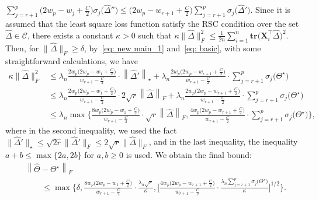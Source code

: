 \documentclass[12pt]{article}
\begin{document}
$\sum_{j=r+1}^{p}\big(2w_{p}-w_{j}+\frac{C}{2}\big)\sigma_{j}\big(\widehat{\Delta}''\big)\leq \big(2w_{p}-w_{r+1}+\frac{C}{2}\big) \sum_{j=r+1}^{p}\sigma_{j}\big(\widehat{\Delta}'\big)$.
\noindent 
Since it is assumed that the least square loss function satisfy the RSC condition over the set $\widehat{\Delta}\in\mathcal{C}$, there exists a constant $\kappa>0$ such that $\kappa \|\widehat{\Delta}\|_{F}^{2}\leq \frac{1}{2n}\sum^{n}_{i=1} \textbf{tr}(\mathbf{X}_{i}^{\top}\widehat{\Delta}\big)^{2}$. 
Then, for $\|\widehat{\Delta}\|_{F}\geq \delta$, by~\eqref{eq: new main_1} and~\eqref{eq: basic}, with some straightforward calculations, we have
\begin{align} 
    \kappa \|\widehat{\Delta}\|_{F}^{2}
    &\leq 
    \lambda_{n}\frac{2w_{p}\big(2w_{p}-w_{1}+\frac{C}{2}\big)}{w_{r+1}-\frac{C}{2}}
    \cdot \left\| \widehat{\Delta}' \right\|_{\star}
    + \lambda_{n}\frac{2w_{p}\big(2w_{p}-w_{r+1}+\frac{C}{2}\big)}{w_{r+1}-\frac{C}{2}} \cdot \sum_{j=r+1}^{p}\sigma_{j}\big(\Theta^{\star}\big) \nonumber \\
    &\leq 
    \lambda_{n}\frac{2w_{p}\big(2w_{p}-w_{1}+\frac{C}{2}\big)}{w_{r+1}-\frac{C}{2}}
    \cdot 2\sqrt{r} \left\| \widehat{\Delta} \right\|_{F}
    + \lambda_{n}\frac{2w_{p}\big(2w_{p}-w_{r+1}+\frac{C}{2}\big)}{w_{r+1}-\frac{C}{2}} \cdot \sum_{j=r+1}^{p}\sigma_{j}\big(\Theta^{\star}\big) \nonumber \\
    &\leq 
    \lambda_{n} 
    \max\bigg\{ \frac{8w_{p}\big(2w_{p}-w_{1}+\frac{C}{2}\big)}{w_{r+1}-\frac{C}{2}}
    \cdot \sqrt{r} \left\| \widehat{\Delta} \right\|_{F},
    \frac{4w_{p}\big(2w_{p}-w_{r+1}+\frac{C}{2}\big)}{w_{r+1}-\frac{C}{2}} \cdot \sum_{j=r+1}^{p}\sigma_{j}\big(\Theta^{\star}\big) 
    \bigg\} \nonumber,
\end{align}
where in the second inequality, we used the fact 
$\|\widehat{\Delta}'\|_{\star}\leq\sqrt{2r}\|\widehat{\Delta}'\|_{F}
\leq 2\sqrt{r}\|\widehat{\Delta}\|_{F}$, and in the last inequality, 
the inequality $a+b\leq \max\{2a, 2b\}$ for $a,b\geq 0$ is used.
We obtain the final bound:
\begin{align*}
    &\left\| \widehat{\Theta} - \Theta^{\star} \right\|_{F} \\
    &\qquad \leq \max\bigg\{ \delta, \frac{8w_{p}\big(2w_{p}-w_{1}+\frac{C}{2}\big)}{w_{r+1}-\frac{C}{2}}
    \cdot \frac{\lambda_{n}\sqrt{r}}{\kappa}, 
    \bigg[  \frac{4w_{p}\big(2w_{p}-w_{r+1}+\frac{C}{2}\big)}{w_{r+1}-\frac{C}{2}} \cdot \frac{\lambda_{n}\sum_{j=r+1}^{p}\sigma_{j}\big(\Theta^{\star}\big)}{\kappa}  \bigg]^{1/2}
    \bigg\}.
\end{align*}
\newpage


\end{document}
